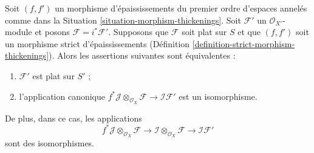 \begin{lemma}
\label{lemma-deform-module}
Soit $(f, f')$ un morphisme d'épaississements du premier ordre d'espaces annelés
comme dans la Situation \ref{situation-morphism-thickenings}.
Soit $\mathcal{F}'$ un $\mathcal{O}_{X'}$-module
et posons $\mathcal{F} = i^*\mathcal{F}'$.
Supposons que $\mathcal{F}$ soit plat sur $S$
et que $(f, f')$ soit un morphisme strict d'épaississements
(Définition \ref{definition-strict-morphism-thickenings}).
Alors les assertions suivantes sont équivalentes :
\begin{enumerate}
\item $\mathcal{F}'$ est plat sur $S'$ ;
\item l'application canonique
$f^*\mathcal{J} \otimes_{\mathcal{O}_X} \mathcal{F} \to
\mathcal{I}\mathcal{F}'$
est un isomorphisme.
\end{enumerate}
De plus, dans ce cas, les applications
$$
f^*\mathcal{J} \otimes_{\mathcal{O}_X} \mathcal{F} \to
\mathcal{I} \otimes_{\mathcal{O}_X} \mathcal{F} \to
\mathcal{I}\mathcal{F}'
$$
sont des isomorphismes.
\end{lemma}

